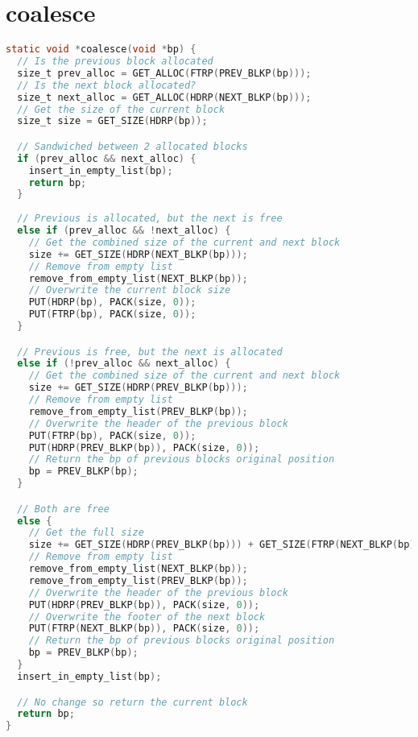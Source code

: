 \documentclass[11pt]{report}
\begin{document}
\section{coalesce}\label{appendix:malloc_lab_code_coalesce}
\begin{lstlisting}[language=C]
static void *coalesce(void *bp) {
  // Is the previous block allocated
  size_t prev_alloc = GET_ALLOC(FTRP(PREV_BLKP(bp)));
  // Is the next block allocated?
  size_t next_alloc = GET_ALLOC(HDRP(NEXT_BLKP(bp)));
  // Get the size of the current block
  size_t size = GET_SIZE(HDRP(bp));

  // Sandwiched between 2 allocated blocks
  if (prev_alloc && next_alloc) {
    insert_in_empty_list(bp);
    return bp;
  }
  
  // Previous is allocated, but the next is free
  else if (prev_alloc && !next_alloc) {
    // Get the combined size of the current and next block
    size += GET_SIZE(HDRP(NEXT_BLKP(bp)));
    // Remove from empty list
    remove_from_empty_list(NEXT_BLKP(bp));
    // Overwrite the current block size
    PUT(HDRP(bp), PACK(size, 0));
    PUT(FTRP(bp), PACK(size, 0));
  }

  // Previous is free, but the next is allocated
  else if (!prev_alloc && next_alloc) {
    // Get the combined size of the current and next block
    size += GET_SIZE(HDRP(PREV_BLKP(bp)));
    // Remove from empty list
    remove_from_empty_list(PREV_BLKP(bp));
    // Overwrite the header of the previous block
    PUT(FTRP(bp), PACK(size, 0));
    PUT(HDRP(PREV_BLKP(bp)), PACK(size, 0));
    // Return the bp of previous blocks original position
    bp = PREV_BLKP(bp);
  } 

  // Both are free
  else {
    // Get the full size
    size += GET_SIZE(HDRP(PREV_BLKP(bp))) + GET_SIZE(FTRP(NEXT_BLKP(bp)));
    // Remove from empty list
    remove_from_empty_list(NEXT_BLKP(bp));
    remove_from_empty_list(PREV_BLKP(bp));
    // Overwrite the header of the previous block
    PUT(HDRP(PREV_BLKP(bp)), PACK(size, 0));
    // Overwrite the footer of the next block
    PUT(FTRP(NEXT_BLKP(bp)), PACK(size, 0));
    // Return the bp of previous blocks original position
    bp = PREV_BLKP(bp);
  }
  insert_in_empty_list(bp);

  // No change so return the current block
  return bp;
}
\end{lstlisting}
\end{document}
